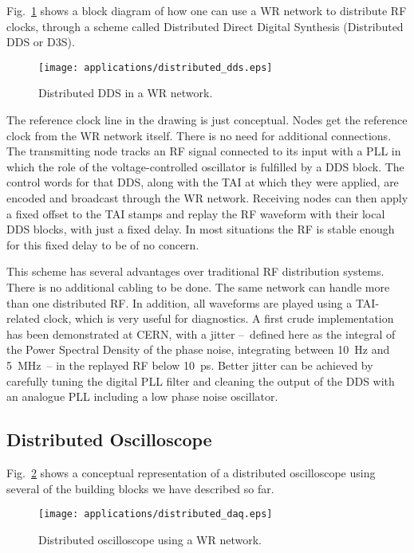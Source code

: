 \documentclass{../JAC2003}
\begin{document}
Fig.~\ref{d3s-fig} shows a block diagram of how one can use a WR network
to distribute RF clocks, through a scheme called Distributed Direct
Digital Synthesis (Distributed DDS or D3S).    

\begin{figure}[htb]
   \centering
   \texttt{[image: applications/distributed\_dds.eps]}
   \caption{Distributed DDS in a WR network.}
   \label{d3s-fig}
\end{figure}

The reference clock line in the drawing is just conceptual. Nodes get
the reference clock from the WR network itself. There is no need for
additional connections. The transmitting node tracks an RF signal
connected to its input with a PLL in which the role of the
voltage-controlled oscillator is fulfilled by a DDS block. The control
words for that DDS, along with the TAI at which they were applied, are
encoded and broadcast through the WR network. Receiving nodes can then
apply a fixed offset to the TAI stamps and replay the RF waveform with
their local DDS blocks, with just a fixed delay. In most situations
the RF is stable enough for this fixed delay to be of no concern.

This scheme has several advantages over traditional RF distribution
systems. There is no additional cabling to be done. The same network
can handle more than one distributed RF. In addition, all waveforms
are played using a TAI-related clock, which is very useful for
diagnostics. A first crude implementation has been demonstrated at
CERN, with a jitter --~defined here as the integral of the Power
Spectral Density of the phase noise, integrating between 10~Hz and
5~MHz~-- in the replayed RF below 10~ps. Better jitter can be achieved
by carefully tuning the digital PLL filter and cleaning the output of
the DDS with an analogue PLL including a low phase noise oscillator.

\subsection{Distributed Oscilloscope}

Fig.~\ref{oscilloscope-fig} shows a conceptual representation of a
distributed oscilloscope using several of the building blocks we have
described so far. 

\begin{figure}[htb]
   \centering
   \texttt{[image: applications/distributed\_daq.eps]}
   \caption{Distributed oscilloscope using a WR network.}
   \label{oscilloscope-fig}
\end{figure}
\end{document}

